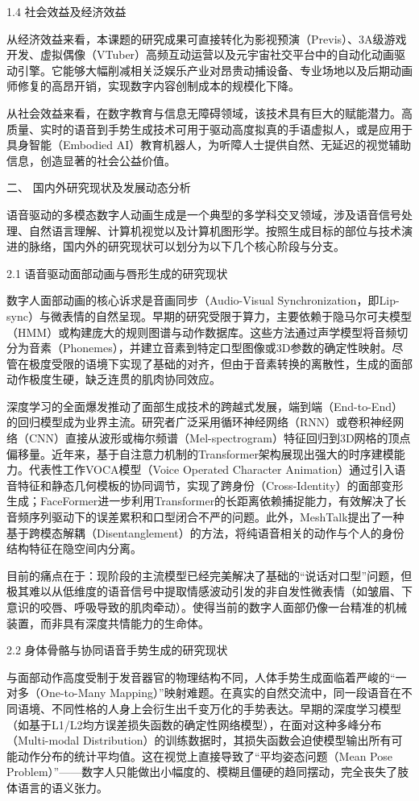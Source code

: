 \documentclass[UTF8]{ctexart}
\begin{document}
1.4 社会效益及经济效益

从经济效益来看，本课题的研究成果可直接转化为影视预演（Previs）、3A级游戏开发、虚拟偶像（VTuber）高频互动运营以及元宇宙社交平台中的自动化动画驱动引擎。它能够大幅削减相关泛娱乐产业对昂贵动捕设备、专业场地以及后期动画师修复的高昂开销，实现数字内容创制成本的规模化下降。

从社会效益来看，在数字教育与信息无障碍领域，该技术具有巨大的赋能潜力。高质量、实时的语音到手势生成技术可用于驱动高度拟真的手语虚拟人，或是应用于具身智能（Embodied
AI）教育机器人，为听障人士提供自然、无延迟的视觉辅助信息，创造显著的社会公益价值。

二、 国内外研究现状及发展动态分析

语音驱动的多模态数字人动画生成是一个典型的多学科交叉领域，涉及语音信号处理、自然语言理解、计算机视觉以及计算机图形学。按照生成目标的部位与技术演进的脉络，国内外的研究现状可以划分为以下几个核心阶段与分支。

2.1 语音驱动面部动画与唇形生成的研究现状

数字人面部动画的核心诉求是音画同步（Audio-Visual
Synchronization，即Lip-sync）与微表情的自然呈现。早期的研究受限于算力，主要依赖于隐马尔可夫模型（HMM）或构建庞大的规则图谱与动作数据库。这些方法通过声学模型将音频切分为音素（Phonemes），并建立音素到特定口型图像或3D参数的确定性映射。尽管在极度受限的语境下实现了基础的对齐，但由于音素转换的离散性，生成的面部动作极度生硬，缺乏连贯的肌肉协同效应。

深度学习的全面爆发推动了面部生成技术的跨越式发展，端到端（End-to-End）的回归模型成为业界主流。研究者广泛采用循环神经网络（RNN）或卷积神经网络（CNN）直接从波形或梅尔频谱（Mel-spectrogram）特征回归到3D网格的顶点偏移量。近年来，基于自注意力机制的Transformer架构展现出强大的时序建模能力。代表性工作VOCA模型（Voice
Operated Character
Animation）通过引入语音特征和静态几何模板的协同调节，实现了跨身份（Cross-Identity）的面部变形生成；FaceFormer进一步利用Transformer的长距离依赖捕捉能力，有效解决了长音频序列驱动下的误差累积和口型闭合不严的问题。此外，MeshTalk提出了一种基于跨模态解耦（Disentanglement）的方法，将纯语音相关的动作与个人的身份结构特征在隐空间内分离。

目前的痛点在于：现阶段的主流模型已经完美解决了基础的``说话对口型''问题，但极其难以从低维度的语音信号中提取情感波动引发的非自发性微表情（如皱眉、下意识的咬唇、呼吸导致的肌肉牵动）。使得当前的数字人面部仍像一台精准的机械装置，而非具有深度共情能力的生命体。

2.2 身体骨骼与协同语音手势生成的研究现状

与面部动作高度受制于发音器官的物理结构不同，人体手势生成面临着严峻的``一对多（One-to-Many
Mapping）''映射难题。在真实的自然交流中，同一段语音在不同语境、不同性格的人身上会衍生出千变万化的手势表达。早期的深度学习模型（如基于L1/L2均方误差损失函数的确定性网络模型），在面对这种多峰分布（Multi-modal
Distribution）的训练数据时，其损失函数会迫使模型输出所有可能动作分布的统计平均值。这在视觉上直接导致了``平均姿态问题（Mean
Pose
Problem）''------数字人只能做出小幅度的、模糊且僵硬的趋同摆动，完全丧失了肢体语言的语义张力。
\end{document}
